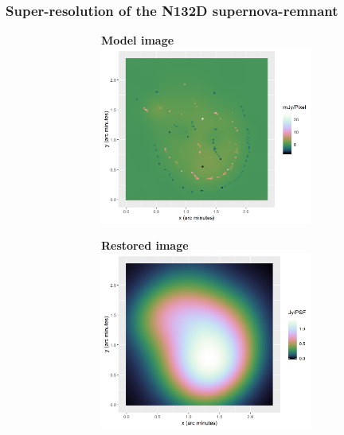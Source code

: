 \subsubsection{Super-resolution of the N132D supernova-remnant}
\begin{figure}[!ht]
	\centering
	\begin{subfigure}[b]{1.0\linewidth}
		\centering
		\begin{subfigure}{0.40\linewidth}
			\centering
			\textbf{Model image}
			\includegraphics[width=1.00\linewidth]{./chapters/10.results/MSClean/Natural-N132.png}
		\end{subfigure}
		\begin{subfigure}{0.40\linewidth}
			\centering
			\textbf{Restored image}
			\includegraphics[width=1.00\linewidth]{./chapters/10.results/MSClean/Natural-image-N132.png}

\end{subfigure}
\end{subfigure}
\end{figure}
